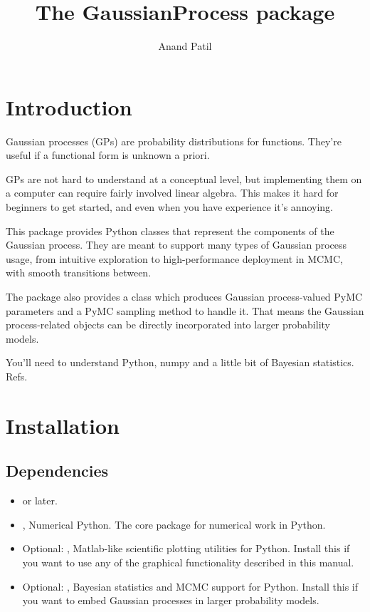 \documentclass{manual}
\begin{document}
\title{The GaussianProcess package}
\author{Anand Patil}
\maketitle
\tableofcontents

\chapter{Introduction}\label{cha:introduction} %

Gaussian processes (GPs) are probability distributions for functions. They're useful if a functional form is unknown a priori.

GPs are not hard to understand at a conceptual level, but implementing them on a computer can require fairly involved linear algebra. This makes it hard for beginners to get started, and even when you have experience it's annoying.

This package provides Python classes that represent the components of the Gaussian process. They are meant to support many types of Gaussian process usage, from intuitive exploration to high-performance deployment in MCMC, with smooth transitions between.

The package also provides a class which produces Gaussian process-valued PyMC parameters and a PyMC sampling method to handle it. That means the Gaussian process-related objects can be directly incorporated into larger probability models.

You'll need to understand Python, numpy and a little bit of Bayesian statistics. Refs.




\chapter{Installation}\label{cha:installation} %

\section{Dependencies}
\begin{itemize}
	\item {} or later.
	\item {}, Numerical Python. The core package for numerical work in Python.
	\item Optional: , Matlab-like scientific plotting utilities for Python. Install this if you want to use any of the graphical functionality described in this manual.
	\item Optional: , Bayesian statistics and MCMC support for Python. Install this if you want to embed Gaussian processes in larger probability models.
\end{itemize} 
\end{document}
